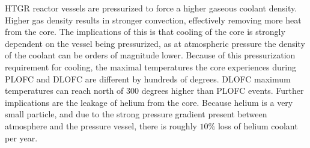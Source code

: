 \documentclass{article}
\begin{document}
HTGR reactor vessels are pressurized to force a higher gaseous coolant density. Higher gas density results in stronger convection, effectively removing more heat from the core. The implications of this is that cooling of the core is strongly dependent on the vessel being pressurized, as at atmospheric pressure the density of the coolant can be orders of magnitude lower. Because of this pressurization requirement for cooling, the maximal temperatures the core experiences during PLOFC and DLOFC are different by hundreds of degrees. DLOFC maximum temperatures can reach north of 300 degrees higher than PLOFC events. Further implications are the leakage of helium from the core. Because helium is a very small particle, and due to the strong pressure gradient present between atmosphere and the pressure vessel, there is roughly $10\%$ loss of helium coolant per year. 
\end{document}
